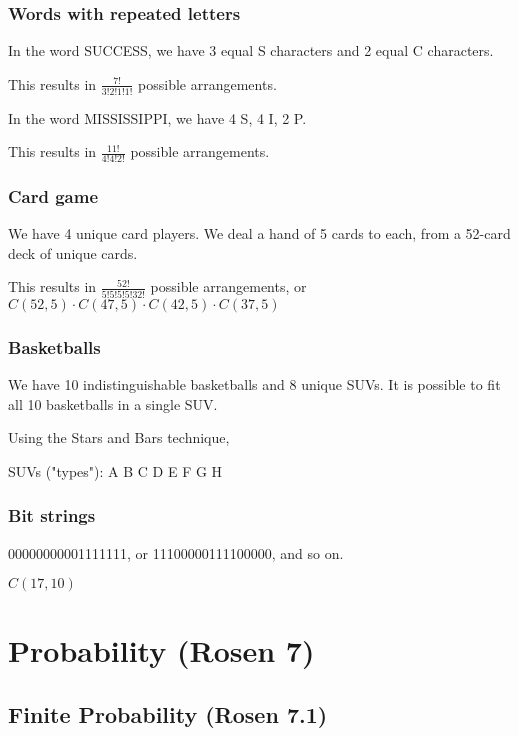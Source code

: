 \documentclass[english,openany]{book}
\begin{document}
    \subsection{Words with repeated letters}

    In the word SUCCESS, we have 3 equal S characters and 2 equal C characters.

    This results in $\frac{7!}{3!2!1!1!}$ possible arrangements.

    In the word MISSISSIPPI, we have 4 S, 4 I, 2 P.

    This results in $\frac{11!}{4!4!2!}$ possible arrangements.\\

    \subsection{Card game}

    We have 4 unique card players. We deal a hand of 5 cards to each, from a 52-card deck of unique cards.

    This results in $\frac{52!}{5!5!5!5!32!}$ possible arrangements, or $C(52,5) \cdot C(47,5) \cdot C(42,5) \cdot C(37,5)$\\

    \subsection{Basketballs}

    We have 10 indistinguishable basketballs and 8 unique SUVs. It is possible to fit all 10 basketballs in a single SUV.

    Using the Stars and Bars technique,

    SUVs ("types"): A B C D E F G H

    \subsection{Bit strings}

    00000000001111111, or 11100000111100000, and so on.

    $C(17,10)$

    \chapter{Probability (Rosen 7)}

    \section{Finite Probability (Rosen 7.1)}
\end{document}
